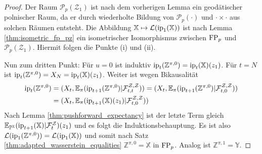 \begin{proof}
    Der Raum $\mathcal{P}_p(\mathcal{Z}_1)$ ist nach dem vorherigen Lemma ein geodätischer polnischer Raum, da er durch wiederholte Bildung von $\mathcal{P}_p(\cdot)$ und $\cdot \times \cdot$ aus solchen Räumen entsteht.
    Die Abbildung $\mathbb{X} \mapsto \mathcal{L}(\operatorname{ip}_1(\mathbb{X}))$ ist nach Lemma \ref{thm:isometric_fp_pz} ein isometrischer Isomorphismus zwischen $\operatorname{FP}_p$ und $\mathcal{P}_p(\mathcal{Z}_1)$. Hiermit folgen die Punkte (i) und (ii).

    Nun zum dritten Punkt: Für $u=0$ ist induktiv $\operatorname{ip}_t(\mathbb{Z}^{\pi,0}) = \operatorname{ip}_t(\mathbb{X})(z_1)$. Für $t=N$ ist $\operatorname{ip}_t(\mathbb{Z}^{\pi,0}) = X_N = \operatorname{ip}_t(\mathbb{X})(z_1)$. Weiter ist wegen Bikausalität
    \begin{align*}
        \operatorname{ip}_t(\mathbb{Z}^{\pi,0}) &= (X_t, \mathbb{E}_\pi(\operatorname{ip}_{t+1}(\mathbb{Z}^{\pi,0}) \vert \mathcal{F}_{t,t}^{\mathcal{Z,Z}})) = (X_t, \mathbb{E}_\pi(\operatorname{ip}_{t+1}(\mathbb{Z}^{\pi,0}) \vert \mathcal{F}_{t,0}^{\mathcal{Z,Z}})) \\
        &= (X_t, \mathbb{E}_\pi(\operatorname{ip}_{t+1}(\mathbb{X})(z_1) \vert \mathcal{F}_{t,0}^{\mathcal{Z,Z}}))
    \end{align*}
    Nach Lemma \ref{thm:pushforward_expectancy} ist der letzte Term gleich $\mathbb{E}_{\mathbb{P}^\mathbb{X}}(\operatorname{ip}_{t+1}(\mathbb{X}) \vert \mathcal{F}_t^\mathcal{Z})(z_1)$ und es folgt die Induktionsbehauptung. Es ist also $\mathcal{L}(\operatorname{ip}_1(\mathbb{Z}^{\pi,0})) = \mathcal{L}(\operatorname{ip}_1(\mathbb{X}))$ und somit nach Satz \ref{thm:adapted_wasserstein_equalities} $\mathbb{Z}^{\pi,0}=\mathbb{X}$ in $\operatorname{FP}_p$. Analog ist $\mathbb{Z}^{\pi,1} = \mathbb{Y}$. 


\end{proof}
